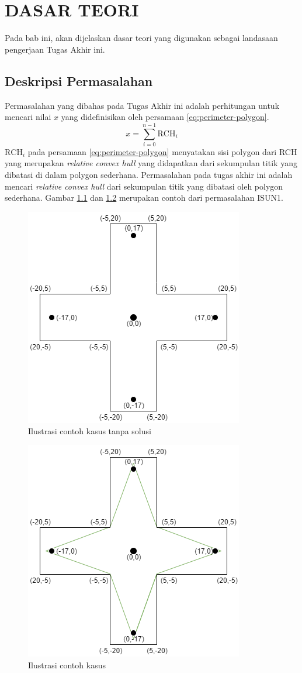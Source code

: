 \chapter {DASAR TEORI}

Pada bab ini, akan dijelaskan dasar teori yang digunakan sebagai landasaan pengerjaan Tugas Akhir ini.

\section{Deskripsi Permasalahan}
Permasalahan yang dibahas pada Tugas Akhir ini adalah perhitungan untuk mencari nilai $x$ yang didefinisikan oleh persamaan \eqref{eq:perimeter-polygon}.
\begin{equation}
    \label{eq:perimeter-polygon}
    x=\sum_{i=0}^{n-1} \text{RCH}_i
\end{equation}
$\text{RCH}_i$ pada persamaan \eqref{eq:perimeter-polygon} menyatakan sisi polygon dari RCH yang merupakan \textit{relative convex hull} yang didapatkan dari sekumpulan titik yang dibatasi di dalam polygon sederhana\cite{isun1}. Permasalahan pada tugas akhir ini adalah mencari \textit{relative convex hull} dari sekumpulan titik yang dibatasi oleh polygon sederhana. Gambar \ref{fig:ilustrasi-contoh-kasus-tanpa-solusi} dan \ref{fig:ilustrasi-contoh-kasus} merupakan contoh dari permasalahan ISUN1.
\begin{figure}
	\Centering
	\includegraphics [width=0.5\columnwidth]{bab2/img/contoh-kasus-tanpa-solusi}
	\caption {Ilustrasi contoh kasus tanpa solusi}
	\label {fig:ilustrasi-contoh-kasus-tanpa-solusi}
\end{figure}
\begin{figure}
	\Centering
	\includegraphics [width=0.5\columnwidth]{bab2/img/contoh-kasus}
	\caption {Ilustrasi contoh kasus}
	\label {fig:ilustrasi-contoh-kasus}
\end{figure}

